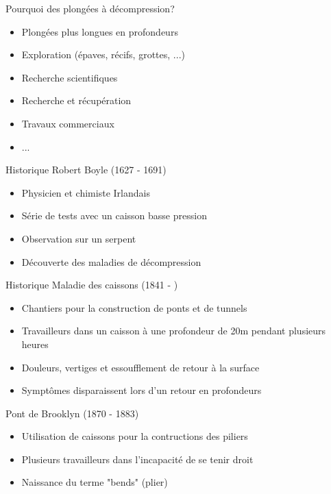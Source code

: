 \begin{frame}{Pourquoi des plongées à décompression?}  
	\begin{itemize}
		\item Plongées plus longues en profondeurs
		\item Exploration (épaves, récifs, grottes, ...)
		\item Recherche scientifiques
		\item Recherche et récupération
		\item Travaux commerciaux
		\item ...
	\end{itemize}
\end{frame}

\begin{frame}{Historique}
	Robert Boyle (1627 - 1691)
	\begin{itemize}
		\item Physicien et chimiste Irlandais
		\item Série de tests avec un caisson basse pression
		\item Observation sur un serpent
		\item Découverte des maladies de décompression
	\end{itemize}
\end{frame}

\begin{frame}{Historique}  
	Maladie des caissons (1841 - )
	\begin{itemize}
		\item Chantiers pour la construction de ponts et de tunnels
		\item Travailleurs dans un caisson à une profondeur de 20m pendant plusieurs heures
		\item Douleurs, vertiges et essoufflement de retour à la surface
		\item Symptômes disparaissent lors d'un retour en profondeurs
	\end{itemize}

	Pont de Brooklyn (1870 - 1883)
	\begin{itemize}
		\item Utilisation de caissons pour la contructions des piliers
		\item Plusieurs travailleurs dans l'incapacité de se tenir droit
		\item Naissance du terme "bends" (plier)
	\end{itemize}
\end{frame}

